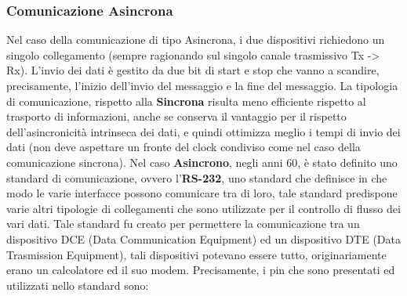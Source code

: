 \subsubsection{Comunicazione Asincrona}
Nel caso della comunicazione di tipo Asincrona, i due dispositivi richiedono un singolo collegamento (sempre ragionando sul singolo canale trasmissivo Tx -> Rx).
L'invio dei dati è gestito da due bit di start e stop che vanno a scandire, precisamente, l'inizio dell'invio del messaggio e la fine del messaggio.
La tipologia di comunicazione, rispetto alla \textbf{Sincrona} risulta meno efficiente rispetto al trasporto di informazioni, anche se conserva il vantaggio per il rispetto dell'asincronicità intrinseca dei dati, e quindi ottimizza meglio i tempi di invio dei dati (non deve aspettare un fronte del clock condiviso come nel caso della comunicazione sincrona).
Nel caso \textbf{Asincrono}, negli anni 60, è stato definito uno standard di comunicazione, ovvero l'\textbf{RS-232}, uno standard che definisce in che modo le varie interfacce possono comunicare tra di loro, tale standard predispone varie altri tipologie di collegamenti che sono utilizzate per il controllo di flusso dei vari dati. Tale standard fu creato per permettere la comunicazione tra un dispositivo DCE (Data Communication Equipment) ed un dispositivo DTE (Data Trasmission Equipment), tali dispositivi potevano essere tutto, originariamente erano un calcolatore ed il suo modem. Precisamente, i pin che sono presentati ed utilizzati nello standard sono:

